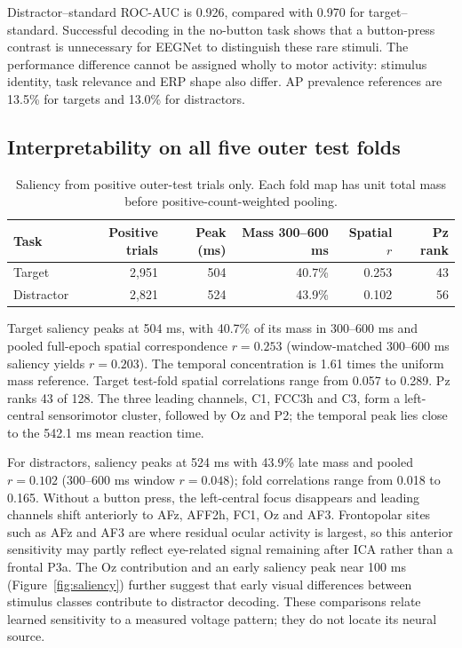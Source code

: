 \documentclass[11pt,a4paper]{article}
\begin{document}
Distractor--standard ROC-AUC is 0.926, compared with 0.970 for target--standard. Successful decoding in the no-button task shows that a button-press contrast is unnecessary for EEGNet to distinguish these rare stimuli. The performance difference cannot be assigned wholly to motor activity: stimulus identity, task relevance and ERP shape also differ. AP prevalence references are 13.5\% for targets and 13.0\% for distractors.

\subsection{Interpretability on all five outer test folds}
\begin{table}[htbp]\centering
\small\setlength{\tabcolsep}{4pt}
\caption{Saliency from positive outer-test trials only. Each fold map has unit total mass before positive-count-weighted pooling.}\label{tab:oofsaliency}
\begin{tabular}{lrrrrr}
\toprule
Task & Positive trials & Peak (ms) & Mass 300--600 ms & Spatial $r$ & Pz rank\\\midrule
Target & 2,951 & 504 & 40.7\% & 0.253 & 43\\
Distractor & 2,821 & 524 & 43.9\% & 0.102 & 56\\
\bottomrule
\end{tabular}\end{table}

Target saliency peaks at 504 ms, with 40.7\% of its mass in 300--600 ms and pooled full-epoch spatial correspondence $r=0.253$ (window-matched 300--600 ms saliency yields $r=0.203$). The temporal concentration is 1.61 times the uniform mass reference. Target test-fold spatial correlations range from 0.057 to 0.289. Pz ranks 43 of 128. The three leading channels, C1, FCC3h and C3, form a left-central sensorimotor cluster, followed by Oz and P2; the temporal peak lies close to the 542.1 ms mean reaction time.

For distractors, saliency peaks at 524 ms with 43.9\% late mass and pooled $r=0.102$ (300--600 ms window $r=0.048$); fold correlations range from 0.018 to 0.165. Without a button press, the left-central focus disappears and leading channels shift anteriorly to AFz, AFF2h, FC1, Oz and AF3. Frontopolar sites such as AFz and AF3 are where residual ocular activity is largest, so this anterior sensitivity may partly reflect eye-related signal remaining after ICA rather than a frontal P3a. The Oz contribution and an early saliency peak near 100 ms (Figure~\ref{fig:saliency}) further suggest that early visual differences between stimulus classes contribute to distractor decoding. These comparisons relate learned sensitivity to a measured voltage pattern; they do not locate its neural source.
\end{document}
